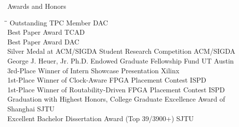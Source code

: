 
\begin{rSection}{Awards and Honors}
\begin{tabbing}
\hspace{5.50in}\= \hspace{1.00in}\= \kill
Outstanding TPC Member \> DAC  \\
Best Paper Award \> TCAD  \\
Best Paper Award \> DAC  \\
Silver Medal at ACM/SIGDA Student Research Competition \> ACM/SIGDA  \\
George J. Heuer, Jr. Ph.D. Endowed Graduate Fellowship Fund \> UT Austin  \\
3rd-Place Winner of Intern Showcase Presentation \> Xilinx  \\
1st-Place Winner of Clock-Aware FPGA Placement Contest \> ISPD  \\
1st-Place Winner of Routability-Driven FPGA Placement Contest \> ISPD  \\
Graduation with Highest Honors, College Graduate Excellence Award of Shanghai \> SJTU  \\
Excellent Bachelor Dissertation Award (Top 39/3900+) \> SJTU  \\

\end{tabbing}
\end{rSection}

